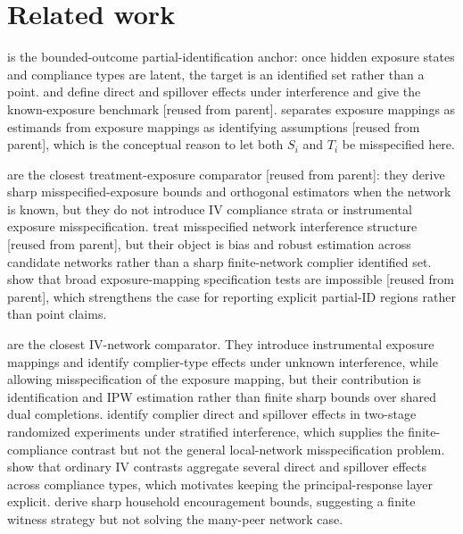 \documentclass[11pt]{article}
\theoremstyle{definition}
\theoremstyle{plain}
\theoremstyle{remark}
\begin{document}
\section{Related work}
\citet{manski1990} is the bounded-outcome partial-identification anchor: once hidden exposure states and compliance types are latent, the target is an identified set rather than a point. \citet{hudgens_halloran_2008} and \citet{aronow_samii_2017} define direct and spillover effects under interference and give the known-exposure benchmark [reused from parent]. \citet{savje_2024_misspecified_exposure_mappings} separates exposure mappings as estimands from exposure mappings as identifying assumptions [reused from parent], which is the conceptual reason to let both \(S_i\) and \(T_i\) be misspecified here.

\citet{schroder_oprescu_feuerriegel_kallus_2026_networks_partialid} are the closest treatment-exposure comparator [reused from parent]: they derive sharp misspecified-exposure bounds and orthogonal estimators when the network is known, but they do not introduce IV compliance strata or instrumental exposure misspecification. \citet{weinstein_nevo_2026} treat misspecified network interference structure [reused from parent], but their object is bias and robust estimation across candidate networks rather than a sharp finite-network complier identified set. \citet{gao_harshaw_savje_wang_2026} show that broad exposure-mapping specification tests are impossible [reused from parent], which strengthens the case for reporting explicit partial-ID regions rather than point claims.

\citet{hoshino_yanagi_2024_noncompliance_unknown_interference} are the closest IV-network comparator. They introduce instrumental exposure mappings and identify complier-type effects under unknown interference, while allowing misspecification of the exposure mapping, but their contribution is identification and IPW estimation rather than finite sharp bounds over shared dual completions. \citet{imai_jiang_malani_2021_interference_noncompliance} identify complier direct and spillover effects in two-stage randomized experiments under stratified interference, which supplies the finite-compliance contrast but not the general local-network misspecification problem. \citet{vazquez_bare_2023_iv_spillovers} show that ordinary IV contrasts aggregate several direct and spillover effects across compliance types, which motivates keeping the principal-response layer explicit. \citet{acerenza_martinez_iriarte_sanchez_becerra_spini_2025_household_bounds} derive sharp household encouragement bounds, suggesting a finite witness strategy but not solving the many-peer network case.
\end{document}
